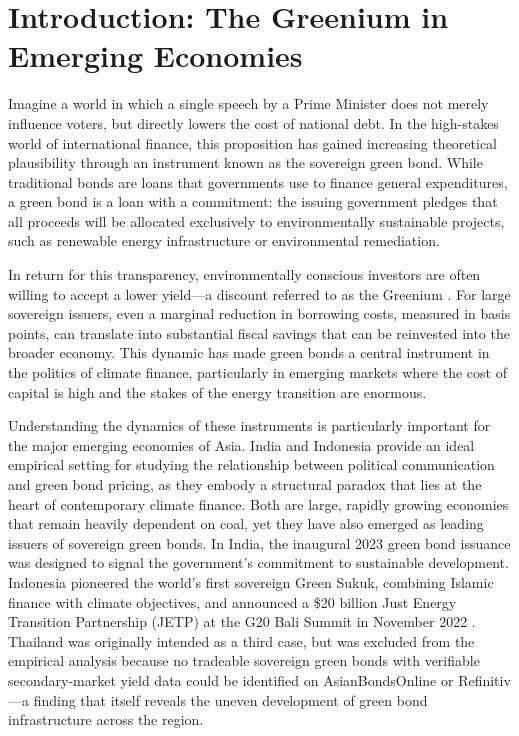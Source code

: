 \documentclass[12pt,a4paper]{article}
\begin{document}
\section{Introduction: The Greenium in Emerging Economies}

Imagine a world in which a single speech by a Prime Minister does not merely influence voters, but directly lowers the cost of national debt. In the high-stakes world of international finance, this proposition has gained increasing theoretical plausibility through an instrument known as the sovereign green bond. While traditional bonds are loans that governments use to finance general expenditures, a green bond is a loan with a commitment: the issuing government pledges that all proceeds will be allocated exclusively to environmentally sustainable projects, such as renewable energy infrastructure or environmental remediation.

In return for this transparency, environmentally conscious investors are often willing to accept a lower yield---a discount referred to as the Greenium \citep{Zerbib2019}. For large sovereign issuers, even a marginal reduction in borrowing costs, measured in basis points, can translate into substantial fiscal savings that can be reinvested into the broader economy. This dynamic has made green bonds a central instrument in the politics of climate finance, particularly in emerging markets where the cost of capital is high and the stakes of the energy transition are enormous.

Understanding the dynamics of these instruments is particularly important for the major emerging economies of Asia. India and Indonesia provide an ideal empirical setting for studying the relationship between political communication and green bond pricing, as they embody a structural paradox that lies at the heart of contemporary climate finance. Both are large, rapidly growing economies that remain heavily dependent on coal, yet they have also emerged as leading issuers of sovereign green bonds. In India, the inaugural 2023 green bond issuance was designed to signal the government's commitment to sustainable development. Indonesia pioneered the world's first sovereign Green Sukuk, combining Islamic finance with climate objectives, and announced a \$20 billion Just Energy Transition Partnership (JETP) at the G20 Bali Summit in November 2022 \citep{Panizza2025}. Thailand was originally intended as a third case, but was excluded from the empirical analysis because no tradeable sovereign green bonds with verifiable secondary-market yield data could be identified on AsianBondsOnline or Refinitiv---a finding that itself reveals the uneven development of green bond infrastructure across the region.
\end{document}
